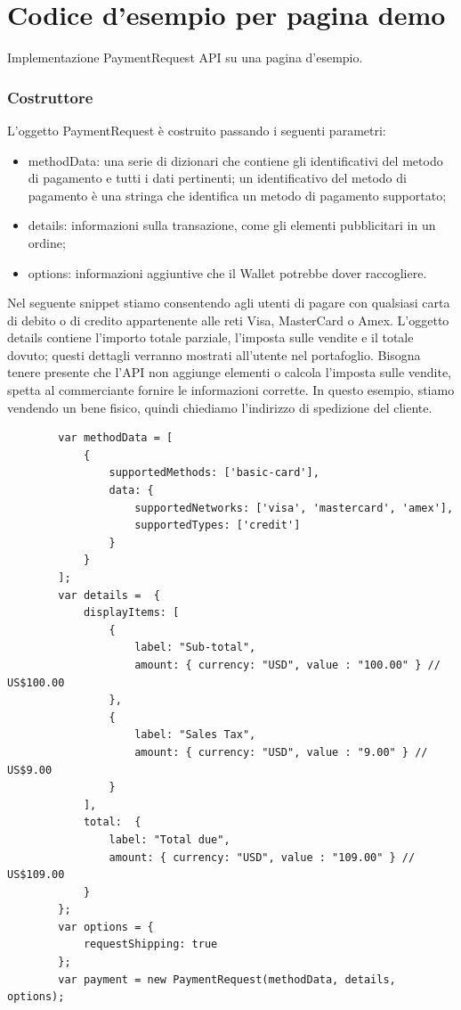 \documentclass[italian]{article}
\begin{document}
	\section{Codice d'esempio per pagina demo}
	Implementazione PaymentRequest API su una pagina d'esempio.
	\subsubsection{Costruttore}
	L'oggetto PaymentRequest è costruito passando i seguenti parametri:
	\begin{itemize}
	\item methodData: una serie di dizionari che contiene gli identificativi del metodo di pagamento e tutti i dati pertinenti; un identificativo del metodo di pagamento è una stringa che identifica un metodo di pagamento supportato;
	\item details: informazioni sulla transazione, come gli elementi pubblicitari in un ordine;
	\item options: informazioni aggiuntive che il Wallet potrebbe dover raccogliere.
	\end{itemize}

	Nel seguente snippet stiamo consentendo agli utenti di pagare con qualsiasi carta di debito o di credito appartenente alle reti Visa, MasterCard o Amex. L'oggetto details contiene l'importo totale parziale, l'imposta sulle vendite e il totale dovuto; questi dettagli verranno mostrati all'utente nel portafoglio. Bisogna tenere presente che l'API non aggiunge elementi o calcola l'imposta sulle vendite, spetta al commerciante fornire le informazioni corrette. In questo esempio, stiamo vendendo un bene fisico, quindi chiediamo l'indirizzo di spedizione del cliente.

	\begin{lstlisting}
		var methodData = [
			{     
				supportedMethods: ['basic-card'],     
				data: {          
					supportedNetworks: ['visa', 'mastercard', 'amex'],
					supportedTypes: ['credit']                 
				}    
			}     
		];
		var details =  {
			displayItems: [
				{
					label: "Sub-total",
					amount: { currency: "USD", value : "100.00" } // US$100.00
				},
				{
					label: "Sales Tax",
					amount: { currency: "USD", value : "9.00" } // US$9.00
				}
			],
			total:  {
				label: "Total due",
				amount: { currency: "USD", value : "109.00" } // US$109.00
			}
		};	
		var options = {
			requestShipping: true 
		};
		var payment = new PaymentRequest(methodData, details, options);
	\end{lstlisting}
	
\end{document}
